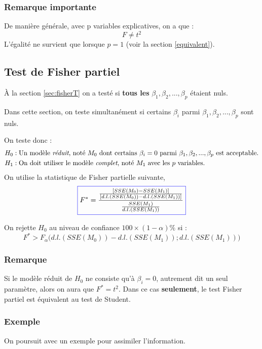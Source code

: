 \documentclass[11pt,french]{report}
\begin{document}
\subsubsection*{Remarque importante}
De manière générale, avec p variables explicatives, on a que :
$$
F \neq t^2
$$
L'égalité ne survient que lorsque $p=1$ (voir la section \ref{equivalent}).

\subsection{Test de Fisher partiel}
\label{sec:testFpartiel}
À la section \ref{sec:fisherT} on a testé si \textbf{tous les} $\beta_1, \beta_2,...,\beta_p$ étaient nuls. \newline

Dans cette section, on teste simultanément si certains $\beta_i$ parmi $\beta_1, \beta_2,...,\beta_p$ sont nuls.

On teste donc :
\begin{align*}
H_0 &: \text{Un modèle \emph{réduit}, noté $M_0$ dont certains $\beta_i =0$ parmi $\beta_1, \beta_2,...,\beta_p$ est acceptable.} \\
H_1 &: \text{On doit utiliser le modèle \emph{complet}, noté $M_1$ avec les $p$ variables.} \\
\end{align*}
On utilise la statistique de Fisher partielle suivante,
\begin{equation}
\label{eq:fisherpartiel}
\color{blue}
\boxed{\color{black}
F^* = \frac{\frac{[SSE(M_0) - SSE(M_1)]}{[d.l.(SSE(M_0)) - d.l.(SSE(M_1))]}}{\frac{SSE(M_1)}{d.l.(SSE(M_1))}}
}
\end{equation}

On rejette $H_0$ au niveau de confiance $100 \times (1 - \alpha)\%$ si :
$$
F^* > F_{\alpha}\Big( d.l.(SSE(M_0)) - d.l.(SSE(M_1)); d.l.(SSE(M_1)) \Big)
$$

\subsubsection*{Remarque}
Si le modèle réduit de $H_0$ ne consiste qu'à $\beta_i =0$, autrement dit un seul paramètre, alors on aura que $F^* = t^2$. Dans ce cas \textbf{seulement}, le test Fisher partiel est équivalent au test de Student.

\subsubsection*{Exemple}
On poursuit avec un exemple pour assimiler l'information. \newline
\end{document}
